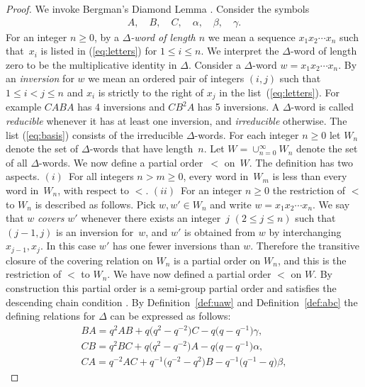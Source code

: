 \documentclass[11pt]{article}
\numberwithin{equation}{section}
\begin{document}
\begin{proof}
We invoke  Bergman's Diamond Lemma
\cite[Theorem~1.2]{berg}.
Consider the symbols
\begin{gather}
\label{eq:letters}
A, \quad B, \quad C, \quad \alpha,\quad \beta, \quad \gamma.
\end{gather}
For an integer $n \geq 0$, by a {\it $\Delta $-word of length $n$}
we mean a sequence
 $x_1x_2\cdots x_n$ such that~$x_i$ is listed in
(\ref{eq:letters}) for $1 \leq i \leq n$.
We interpret the
$\Delta $-word
of length zero to be the multiplicative
identity in $\Delta $.
Consider a
 $\Delta $-word
$w=x_1x_2\cdots x_n$.
By an {\it inversion} for $w$
we mean an ordered pair of integers $(i,j)$
such that
$1\leq i<j\leq n$ and
$x_i$ is strictly to the right of
$x_j$ in the list~(\ref{eq:letters}).
For example $CABA$ has 4 inversions
and
$CB^2A$ has 5 inversions.
A $\Delta $-word is called {\it reducible} whenever it has at least one
inversion, and {\it irreducible} otherwise.
The list
(\ref{eq:basis}) consists of the irreducible $\Delta $-words.
For each integer $n\geq 0$ let
$W_n$ denote the set of $\Delta $-words that have
length~$n$.
Let $W=\cup_{n=0}^\infty W_n$ denote the
set of all
$\Delta $-words.
We now def\/ine a partial
order~$<$ on~$W$.
The def\/inition has two aspects.
$(i)$~For all integers  $n> m\geq 0$,
every word in~$W_m$ is less than
every word in~$W_n$, with respect to $<$.
$(ii)$~For an integer $n\geq 0$
the restriction of $<$ to $W_n$ is
described as follows.
Pick $w, w' \in
 W_n$ and write
 $w=x_1x_2\cdots x_n$.
We say that $w$ {\it covers} $w'$ whenever
there exists an integer~$j$ $(2 \leq j \leq n)$
such that $(j-1,j)$ is an inversion for~$w$,
and
$w'$ is obtained from $w$ by interchanging
$x_{j-1},x_j$.
In this case
$w'$ has one fewer inversions than $w$.
Therefore the transitive closure of the covering
relation on $W_n$ is a partial order on $W_n$, and this is
the restriction of
 $<$ to $W_n$.
We have now def\/ined a partial order $<$ on $W$.
By construction this partial order is
a semi-group partial order
\cite[p.~181]{berg} and satisf\/ies the
descending chain condition
\cite[p.~179]{berg}.
By Def\/inition~\ref{def:uaw} and
Def\/inition~\ref{def:abc}
the def\/ining relations for $\Delta $ can be expressed
as follows:
\begin{gather*}
 BA  =  q^2AB+q\big(q^2-q^{-2}\big)C-q\big(q-q^{-1}\big)\gamma,
\\
 CB  =  q^2BC+q\big(q^2-q^{-2}\big)A-q\big(q-q^{-1}\big)\alpha,
\\
 CA  =  q^{-2}AC+q^{-1}\big(q^{-2}-q^2\big)B-q^{-1}\big(q^{-1}-q\big)\beta,

\end{gather*}
\end{proof}
\end{document}
